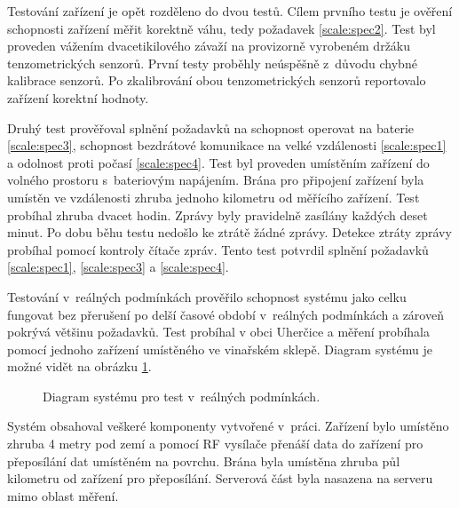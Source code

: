 

Testování zařízení je opět rozděleno do dvou testů. Cílem prvního testu je ověření schopnosti zařízení měřit korektně váhu, tedy požadavek \ref{scale:spec2}. Test byl proveden vážením dvacetikilového závaží na provizorně vyrobeném držáku tenzometrických senzorů. První testy proběhly neúspěšně z~důvodu chybné kalibrace senzorů. Po zkalibrování obou tenzometrických senzorů reportovalo zařízení korektní hodnoty. 

Druhý test prověřoval splnění požadavků na schopnost operovat na baterie \ref{scale:spec3}, schopnost bezdrátové komunikace na velké vzdálenosti \ref{scale:spec1} a odolnost proti počasí \ref{scale:spec4}. Test byl proveden umístěním zařízení do volného prostoru s~bateriovým napájením. Brána pro připojení zařízení byla umístěn ve vzdálenosti zhruba jednoho kilometru od měřícího zařízení. Test probíhal zhruba dvacet hodin. Zprávy byly pravidelně zasílány každých deset minut. Po dobu běhu testu nedošlo ke ztrátě žádné zprávy. Detekce ztráty zprávy probíhal pomocí kontroly čítače zpráv. Tento test potvrdil splnění požadavků \ref{scale:spec1}, \ref{scale:spec3} a \ref{scale:spec4}.

 \label{sec:real_tests}
Testování v~reálných podmínkách prověřilo schopnost systému jako celku fungovat bez přerušení po delší časové období v~reálných podmínkách a zároveň pokrývá většinu požadavků. Test probíhal v obci Uherčice a měření probíhala pomocí jednoho zařízení umístěného ve vinařském sklepě. Diagram systému je možné vidět na obrázku \ref{pic:real_test_setup}. 

\begin{figure}[h]
  \centering
  
  \caption{Diagram systému pro test v~reálných podmínkách.}
  \label{pic:real_test_setup}
\end{figure}

Systém obsahoval veškeré komponenty vytvořené v~práci. Zařízení bylo umístěno zhruba 4 metry pod zemí a pomocí RF vysílače přenáší data do zařízení pro přeposílání dat umístěném na povrchu. Brána byla umístěna zhruba půl kilometru od zařízení pro přeposílání. Serverová část byla nasazena na serveru mimo oblast měření. 

